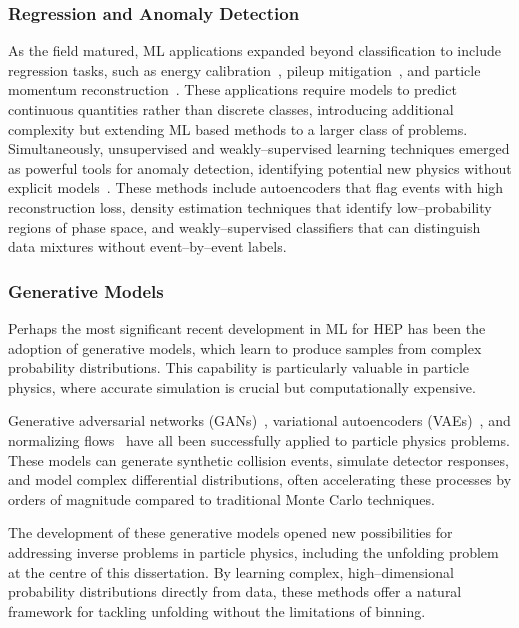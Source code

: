 \subsubsection{Regression and Anomaly Detection}
As the field matured, ML applications expanded beyond classification to include regression tasks, such as energy calibration~\cite{Holmberg2023JetPipeline}, pileup mitigation~\cite{Komiske2018PileupPUMML}, and particle momentum reconstruction~\cite{Haake2019Machine-learning-basedCollisions}.
%
These applications require models to predict continuous quantities rather than discrete classes, introducing additional complexity but extending ML based methods to a larger class of problems.
%
Simultaneously, unsupervised and weakly--supervised learning techniques emerged as powerful tools for anomaly detection, identifying potential new physics without explicit models~\cite{Belis2024MachinePhysics}.
%
These methods include autoencoders that flag events with high reconstruction loss, density estimation techniques that identify low--probability regions of phase space, and weakly--supervised classifiers that can distinguish data mixtures without event--by--event labels.

\subsubsection{Generative Models}
Perhaps the most significant recent development in ML for HEP has been the adoption of generative models, which learn to produce samples from complex probability distributions.
%
This capability is particularly valuable in particle physics, where accurate simulation is crucial but computationally expensive.

Generative adversarial networks (GANs)~\cite{Goodfellow2014GenerativeNetworks}, variational autoencoders (VAEs)~\cite{Kingma2019AnAutoencoders}, and normalizing flows~\cite{Kobyzev2019NormalizingMethods} have all been successfully applied to particle physics problems.
%
These models can generate synthetic collision events\cite{Moodie2022OptimisingNetworks}, simulate detector responses\cite{Darulis2022MachineSimulations, Xu2023GenerativeFlow}, and model complex differential distributions,\cite{Butter2025GenerativeMapping} often accelerating these processes by orders of magnitude compared to traditional Monte Carlo techniques.

The development of these generative models opened new possibilities for addressing inverse problems in particle physics, including the unfolding problem at the centre of this dissertation.
%
By learning complex, high--dimensional probability distributions directly from data, these methods offer a natural framework for tackling unfolding without the limitations of binning.

